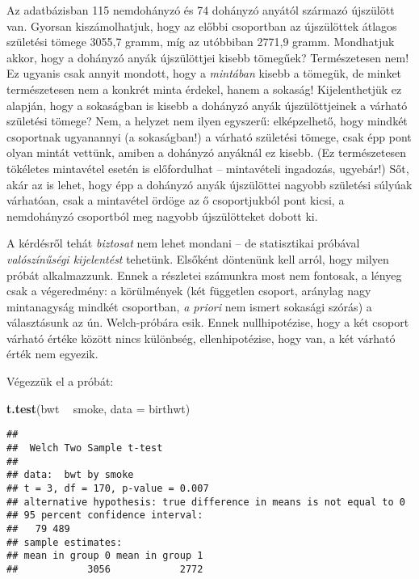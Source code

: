 \documentclass[
]{book}
\newenvironment{Shaded}{\begin{snugshade}}{\end{snugshade}}
\newcommand{\DataTypeTok}[1]{\textcolor[rgb]{0.13,0.29,0.53}{#1}}
\newcommand{\KeywordTok}[1]{\textcolor[rgb]{0.13,0.29,0.53}{\textbf{#1}}}
\newcommand{\NormalTok}[1]{#1}
\newcommand{\OperatorTok}[1]{\textcolor[rgb]{0.81,0.36,0.00}{\textbf{#1}}}
\newcommand{\StringTok}[1]{\textcolor[rgb]{0.31,0.60,0.02}{#1}}
\begin{document}
Az adatbázisban 115 nemdohányzó és 74 dohányzó anyától származó újszülött van. Gyorsan kiszámolhatjuk, hogy az előbbi csoportban az újszülöttek átlagos születési tömege 3055,7 gramm, míg az utóbbiban 2771,9 gramm. Mondhatjuk akkor, hogy a dohányzó anyák újszülöttjei kisebb tömegűek? Természetesen nem! Ez ugyanis csak annyit mondott, hogy a \emph{mintában} kisebb a tömegük, de minket természetesen nem a konkrét minta érdekel, hanem a sokaság! Kijelenthetjük ez alapján, hogy a sokaságban is kisebb a dohányzó anyák újszülöttjeinek a várható születési tömege? Nem, a helyzet nem ilyen egyszerű: elképzelhető, hogy mindkét csoportnak ugyanannyi (a sokaságban!) a várható születési tömege, csak épp pont olyan mintát vettünk, amiben a dohányzó anyáknál ez kisebb. (Ez természetesen tökéletes mintavétel esetén is előfordulhat -- mintavételi ingadozás, ugyebár!) Sőt, akár az is lehet, hogy épp a dohányzó anyák újszülöttei nagyobb születési súlyúak várhatóan, csak a mintavétel ördöge az ő csoportjukból pont kicsi, a nemdohányzó csoportból meg nagyobb újszülötteket dobott ki.

A kérdésről tehát \emph{biztosat} nem lehet mondani -- de statisztikai próbával \emph{valószínűségi kijelentést} tehetünk. Elsőként döntenünk kell arról, hogy milyen próbát alkalmazzunk. Ennek a részletei számunkra most nem fontosak, a lényeg csak a végeredmény: a körülmények (két független csoport, aránylag nagy mintanagyság mindkét csoportban, \emph{a priori} nem ismert sokasági szórás) a választásunk az ún. Welch-próbára esik. Ennek nullhipotézise, hogy a két csoport várható értéke között nincs különbség, ellenhipotézise, hogy van, a két várható érték nem egyezik.

Végezzük el a próbát:

\begin{Shaded}
\begin{Highlighting}[]
\KeywordTok{t.test}\NormalTok{(bwt }\OperatorTok{~}\StringTok{ }\NormalTok{smoke, }\DataTypeTok{data =}\NormalTok{ birthwt)}
\end{Highlighting}
\end{Shaded}

\begin{verbatim}
## 
##  Welch Two Sample t-test
## 
## data:  bwt by smoke
## t = 3, df = 170, p-value = 0.007
## alternative hypothesis: true difference in means is not equal to 0
## 95 percent confidence interval:
##   79 489
## sample estimates:
## mean in group 0 mean in group 1 
##            3056            2772
\end{verbatim}
\end{document}

